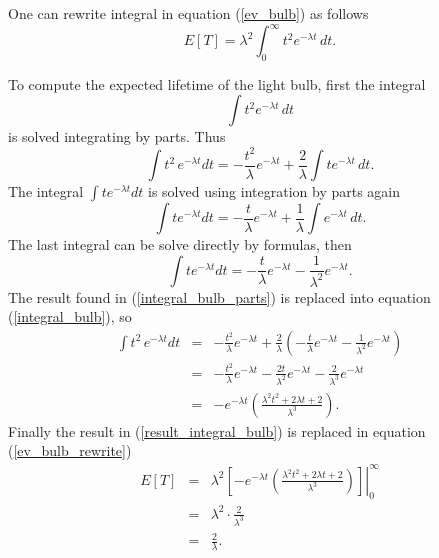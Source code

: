 \documentclass[12pt]{article}
\begin{document}
	One can rewrite integral in equation (\ref{ev_bulb}) as follows
	\begin{equation}
	E[T] = \lambda^2 \int_{0}^{\infty}  t^2 e^{-\lambda t} \, dt.
	\label{ev_bulb_rewrite}
	\end{equation}
	
	To compute the expected lifetime of the light bulb, first the integral 
	\begin{equation*}
	\int t^2 e^{-\lambda t} \, dt
	\end{equation*}
	is solved integrating by parts. Thus
	\begin{equation}
	\int t^2 \, e^{-\lambda t} dt = -\frac{t^2}{\lambda} e^{-\lambda t} + \frac{2}{\lambda} \int te^{-\lambda t} \, dt.
	\label{integral_bulb}
	\end{equation}
	The integral $\int te^{-\lambda t} dt$ is solved using integration by parts again
	\begin{equation*}
	\int te^{-\lambda t} dt = - \frac{t}{\lambda} e^{-\lambda t} + \frac{1}{\lambda} \int e^{-\lambda t} \, dt.
	\end{equation*}
	The last integral can be solve directly by formulas, then
	\begin{equation}
	\int te^{-\lambda t} dt = - \frac{t}{\lambda} e^{-\lambda t} - \frac{1}{\lambda^2} e^{-\lambda t}.
	\label{integral_bulb_parts}
	\end{equation}
	The result found in (\ref{integral_bulb_parts}) is replaced into equation (\ref{integral_bulb}), so
	\begin{eqnarray}
	\int t^2 \, e^{-\lambda t} dt &=& -\frac{t^2}{\lambda} e^{-\lambda t} + \frac{2}{\lambda} \left(  - \frac{t}{\lambda} e^{-\lambda t} - \frac{1}{\lambda^2} e^{-\lambda t} \right) \nonumber \\
	&=& -\frac{t^2}{\lambda} e^{-\lambda t} - \frac{2t}{\lambda^2} e^{-\lambda t} - \frac{2}{\lambda^3} e^{-\lambda t} \nonumber \\
	&=& -e^{-\lambda t} \left( \frac{\lambda^2 t^2 + 2\lambda t + 2}{\lambda^3} \right) \label{result_integral_bulb}.
	\end{eqnarray}
	Finally the result in (\ref{result_integral_bulb}) is replaced in equation (\ref{ev_bulb_rewrite}) 
	\begin{eqnarray*}
	E[T] &=& \lambda^2 \left. \left[ -e^{-\lambda t} \left( \frac{\lambda^2 t^2 + 2\lambda t + 2}{\lambda^3} \right) \right] \right|_{0}^{\infty} \\
	&=& \lambda^2 \cdot \frac{2}{\lambda^3} \\
	&=& \frac{2}{\lambda}.
	\end{eqnarray*}
	
\end{document}
